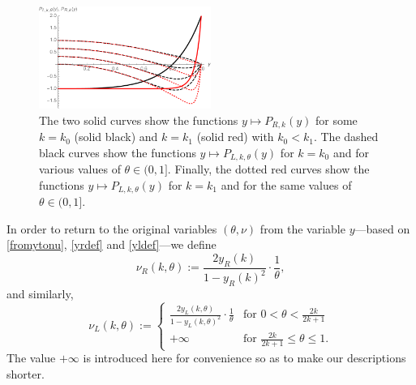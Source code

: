 \documentclass[smallextended,numbook,runningheads]{svjour3}     %
\newcommand{\te}{\theta}
\newcommand{\nul}{\nu_L(k,\theta)}
\newcommand{\nur}{\nu_R(k,\theta)}
\newcommand{\yl}{y_L(k,\theta)}
\newcommand{\yr}{y_R(k)}
\newcommand{\Por}{P_{R,k}(y)}
\newcommand{\Pol}{P_{L,k,\te}(y)}
\begin{document}
\begin{figure}
\begin{center}
\includegraphics[width=0.5\textwidth]{fig_someplpr.pdf}
\caption{The two solid curves show the functions $y\mapsto\Por$ for some $k=k_0$ (solid black) and 
 $k=k_1$ (solid red) with $k_0<k_1$.  The dashed black curves show the functions $y\mapsto\Pol$ for $k=k_0$ and for various values of $\te\in(0,1]$. Finally, the dotted red curves show the functions $y\mapsto\Pol$ for $k=k_1$ and for the same values of $\te\in(0,1]$.}\label{fig_someplpr}
\end{center}
\end{figure}




In order to return to the original variables $(\te,\nu)$ from the variable $y$---based on \eqref{fromytonu},  \eqref{yrdef} and \eqref{yldef}---we define
\begin{equation}\label{nurdef}
\nur:=\frac{2\yr}{1-\yr^2}\cdot \frac{1}{\te},
\end{equation}
and similarly,
\begin{equation}\label{nuldef}
\nul:=\begin{cases}
 \frac{2\yl}{1-\yl^2}\cdot \frac{1}{\te} & \text{for } 0<\te<\frac{2k}{2k+1}\\
 +\infty & \text{for } \frac{2k}{2k+1}\le \te\le 1.
\end{cases}
\end{equation}
The value $+\infty$ is introduced here for convenience so as to make our descriptions shorter.
\end{document}
